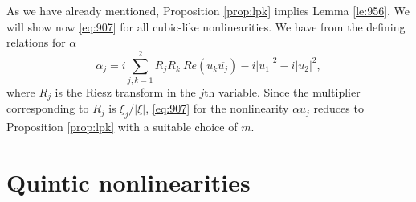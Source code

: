 \documentclass[draft,11pt,leqno]{amsart}
\newcommand{\al}{\alpha}
\newcommand{\suml}{\sum\limits}
\begin{document}
As we have already mentioned, Proposition \ref{prop:lpk} implies 
Lemma \ref{le:956}. We will show now \eqref{eq:907} for all cubic-like
nonlinearities.
We have from the defining relations for $\al$
$$
\al_j=i \suml_{j,k=1}^2R_jR_k \ Re(u_k \overline{u_j}) -
i|u_1|^2-i|u_2|^2,
$$
where $R_j$ is the Riesz transform in the $j$th variable. Since 
the multiplier corresponding to 
$R_j$ is $\xi_j/|\xi|$, \eqref{eq:907} for the nonlinearity
$\al u_j$ reduces to Proposition \ref{prop:lpk} 
with a suitable choice of $m$. 

\vspace{.5cm}
\section{Quintic nonlinearities}
\label{sec:quintic}

\vspace{.5cm}
\end{document}
